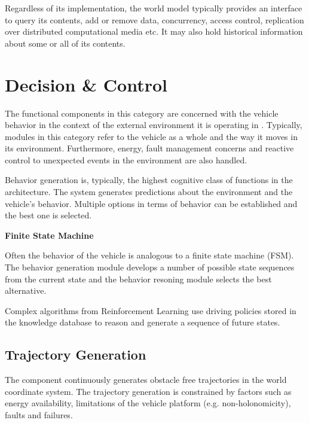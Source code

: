 Regardless of its implementation, the world model typically provides an interface to query its contents, add or remove data, concurrency, access control, replication over distributed computational media etc. It may also hold historical information about some or all of its contents.  


\section{Decision \& Control}
The functional components in this category are concerned with the vehicle behavior 
in the context of the external environment it is operating in \cite{Bahere}. Typically, modules in this category refer to the vehicle as a whole and the way it
moves in its environment. Furthermore, energy, fault management concerns and reactive control to unexpected events in the environment are also handled. 


Behavior generation is, typically, the highest cognitive class of functions in the architecture. The system generates
predictions about the environment and the vehicle's behavior. Multiple options in terms of behavior 
can be established and the best one is selected.


\begin{framed}
\theoremstyle{remark}
\begin{remark}{\textbf{Finite State Machine}}

Often the behavior of the vehicle is analogous to a finite state machine (FSM). The behavior generation module
develops a number of possible state sequences from the current state and the behavior resoning module selects the best alternative.

\end{remark}
\end{framed}


Complex algorithms from Reinforcement Learning use driving policies stored in the knowledge database to reason
and generate a sequence of future states. 



\subsection{Trajectory Generation}
The component continuously generates obstacle free trajectories in the world coordinate system. The trajectory generation is constrained by factors such as energy availability, limitations of the vehicle platform (e.g. non-holonomicity), faults and failures. 

